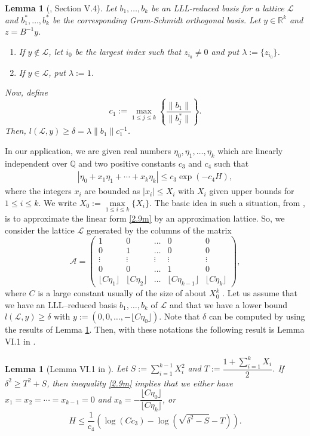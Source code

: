 \documentclass[11pt,a4paper]{article}
\newtheorem{lemma}[theorem]{Lemma}
\numberwithin{equation}{section}
\numberwithin{table}{section}
\numberwithin{figure}{section}
\begin{document}
\begin{lemma}[\cite{SMA}, Section V.4]\label{lem2.5m}
	Let $b_1, \dots, b_k$ be an LLL-reduced basis for a lattice $\mathcal{L}$ and $b_1^*, \dots, b_k^*$ be the corresponding Gram-Schmidt orthogonal basis. Let $y\in\mathbb{R}^k$ and $z=B^{-1}y$.
	\begin{enumerate}[\upshape(i)]
		\item If $y\not \in \mathcal{L}$, let $i_0$ be the largest index such that $z_{i_0}\ne 0$ and put $\lambda:=\{z_{i_0}\}$.
		\item If $y\in \mathcal{L}$, put $\lambda:=1$.
	\end{enumerate}
	Now, define
	\[
	c_1 := \max_{1\le j\le k}\left\{\dfrac{\|b_1\|}{\|b_j^*\|}\right\}.
	\]
	Then, $l(\mathcal{L}, y) \ge  \delta = \lambda\|b_1\|c_1^{-1}$.
\end{lemma}

In our application, we are given real numbers $\eta_0,\eta_1,\ldots,\eta_k$ which are linearly independent over $\mathbb{Q}$ and two positive constants $c_3$ and $c_4$ such that 
\begin{align}\label{2.9m}
	|\eta_0+x_1\eta_1+\cdots +x_k \eta_k|\le c_3 \exp(-c_4 H),
\end{align}
where the integers $x_i$ are bounded as $|x_i|\le X_i$ with $X_i$ given upper bounds for $1\le i\le k$. We write $X_0:=\max\limits_{1\le i\le k}\{X_i\}$. The basic idea in such a situation, from \cite{Weg}, is to approximate the linear form \eqref{2.9m} by an approximation lattice. So, we consider the lattice $\mathcal{L}$ generated by the columns of the matrix
$$ \mathcal{A}=\begin{pmatrix}
	1 & 0 &\ldots& 0 & 0 \\
	0 & 1 &\ldots& 0 & 0 \\
	\vdots & \vdots &\vdots& \vdots & \vdots \\
	0 & 0 &\ldots& 1 & 0 \\
	\lfloor C\eta_1\rfloor & \lfloor C\eta_2\rfloor&\ldots & \lfloor C\eta_{k-1}\rfloor& \lfloor C\eta_{k} \rfloor
\end{pmatrix} ,$$
where $C$ is a large constant usually of the size of about $X_0^k$ . Let us assume that we have an LLL--reduced basis $b_1,\ldots, b_k$ of $\mathcal{L}$ and that we have a lower bound $l\left(\mathcal{L},y\right)\ge \delta$ with $y:=(0,0,\ldots,-\lfloor C\eta_0\rfloor)$. Note that $ \delta$ can be computed by using the results of Lemma \ref{lem2.5m}. Then, with these notations the following result  is Lemma VI.1 in \cite{SMA}.
\begin{lemma}[Lemma VI.1 in \cite{SMA}]\label{lem2.6m}
	Let $S:=\displaystyle\sum_{i=1}^{k-1}X_i^2$ and $T:=\dfrac{1+\sum_{i=1}^{k}X_i}{2}$. If $\delta^2\ge T^2+S$, then inequality \eqref{2.9m} implies that we either have $x_1=x_2=\cdots=x_{k-1}=0$ and $x_k=-\dfrac{\lfloor C\eta_0 \rfloor}{\lfloor C\eta_k \rfloor}$, or
	\[
	H\le \dfrac{1}{c_4}\left(\log(Cc_3)-\log\left(\sqrt{\delta^2-S}-T\right)\right).
	\]
\end{lemma}
\end{document}
